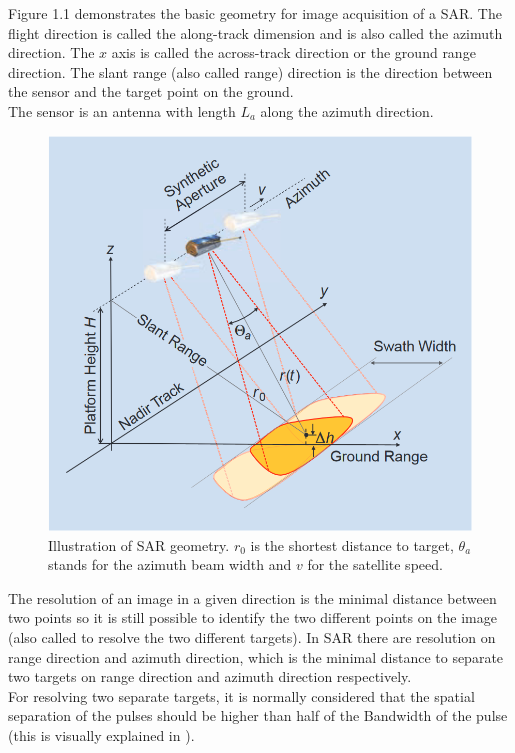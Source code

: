 Figure 1.1 demonstrates the basic geometry for image acquisition of a SAR. The flight direction is called the along-track dimension and is also called the azimuth direction. The $x$ axis is called the across-track direction or the ground range direction. The slant range (also called range) direction is the direction between the sensor and the target point on the ground.\\
The sensor is an antenna with length $L_a$ along the azimuth direction.

\begin{figure}[H]
    \centering
    \includegraphics[width=0.8\linewidth]{Cap1/geometry.png}
    \caption{Illustration of SAR geometry. $r_0$ is the shortest distance to target, $\theta_a$ stands for the azimuth beam width and $v$ for the satellite speed. \cite{tutorial}}
    \label{fig:SAR_geometry}
\end{figure}{}

The resolution of an image in a given direction is the minimal distance between two points so it is still possible to identify the two different points on the image (also called to resolve the two different targets). In SAR there are resolution on range direction and azimuth direction, which is the minimal distance to separate two targets on range direction and azimuth direction respectively.\\
For resolving two separate targets, it is normally considered that the spatial separation of the pulses should be higher than half of the Bandwidth of the pulse (this is visually explained in ).

